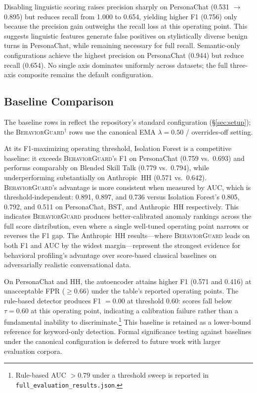 \documentclass[conference]{IEEEtran}
\newcommand{\BG}{\textsc{BehaviorGuard}}
\begin{document}
Disabling linguistic scoring raises precision sharply on PersonaChat (0.531 $\to$ 0.895)
but reduces recall from 1.000 to 0.654, yielding higher F1 (0.756) only because the
precision gain outweighs the recall loss at this operating point.
This suggests linguistic features generate false positives on stylistically diverse
benign turns in PersonaChat, while remaining necessary for full recall.
Semantic-only configurations achieve the highest precision on PersonaChat (0.944)
but reduce recall (0.654).
No single axis dominates uniformly across datasets; the full three-axis composite
remains the default configuration.

\subsection{Baseline Comparison}
\label{sec:results:baselines}

The baseline rows in  reflect the repository's standard configuration
(\S\ref{sec:setup}); the \BG{}$^\dagger$ rows use the canonical EMA $\lambda{=}0.50$ /
overrides-off setting.

At its F1-maximizing operating threshold, Isolation Forest is a competitive baseline:
it exceeds \BG{}'s F1 on PersonaChat (0.759 vs.\ 0.693) and performs comparably on
Blended Skill Talk (0.779 vs.\ 0.794), while underperforming substantially on
Anthropic~HH (0.571 vs.\ 0.642).
\BG{}'s advantage is more consistent when measured by AUC, which is
threshold-independent: 0.891, 0.897, and 0.736 versus Isolation Forest's 0.805,
0.792, and 0.511 on PersonaChat, BST, and Anthropic~HH respectively.
This indicates \BG{} produces better-calibrated anomaly rankings across the full
score distribution, even where a single well-tuned operating point narrows or
reverses the F1 gap.
The Anthropic~HH results---where \BG{} leads on both F1 and AUC by the widest
margin---represent the strongest evidence for behavioral profiling's advantage over
score-based classical baselines on adversarially realistic conversational data.

On PersonaChat and HH, the autoencoder attains higher F1 (0.571 and 0.416) at
unacceptable FPR ($\ge 0.66$) under the table's reported operating points.
The rule-based detector produces F1 $= 0.00$ at threshold $0.60$: scores fall below
$\tau{=}0.60$ at this operating point, indicating a calibration failure rather than a
fundamental inability to discriminate.\footnote{Rule-based AUC $> 0.79$ under a
threshold sweep is reported in \texttt{full\_evaluation\_results.json}.}
This baseline is retained as a lower-bound reference for keyword-only detection.
Formal significance testing against baselines under the canonical configuration is
deferred to future work with larger evaluation corpora.
\end{document}
